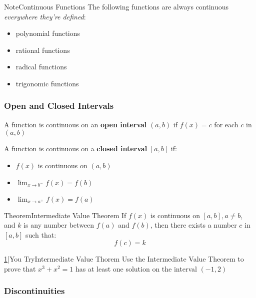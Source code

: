 \documentclass{MathNotes}
\newenvironment{note}[1]
{\begin{YellowBox}{Note}{#1}}{\end{YellowBox}}
\newenvironment{theorem}[1]
{\begin{GrayBox}{Theorem}{#1}}{\end{GrayBox}}
\newenvironment{practice}[2]
{\begin{PurpleBox}{\texorpdfstring{#1}\Big|You Try}{#2}}{\end{PurpleBox}}
\begin{document}
\begin{note}{Continuous Functions}
    The following functions are always continuous \textit{everywhere
    they're defined}:
    \begin{itemize}
        \item polynomial functions
        \item rational functions
        \item radical functions
        \item trigonomic functions
    \end{itemize}
\end{note}

\subsubsection{Open and Closed Intervals}\label{sec:1.3.1}
A function is continuous on an \textbf{open interval} $(a, b)$ if
$f(x)=c$ for each $c$ in $(a, b)$

A function is continuous on a \textbf{closed interval} $[a, b]$ if:
\begin{itemize}
    \item $f(x)$ is continuous on $(a, b)$
    \item $\lim_{x\to b^-}f(x)=f(b)$
    \item $\lim_{x\to a^+}f(x)=f(a)$
\end{itemize}

\begin{theorem}{Intermediate Value Theorem}
    If $f(x)$ is continuous on $[a, b], a\neq b$, and $k$ is any number
    between $f(a)$ and $f(b)$, then there exists a number $c$ in
    $[a, b]$ such that: $$f(c)=k$$
\end{theorem}

\begin{practice}{\hyperref[ans:1.3.1-1]{1}}{Intermediate Value Thorem}
    \label{prac:1.3.1-1}
    Use the Intermediate Value Theorem to prove that $x^3+x^2=1$ has at least
    one solution on the interval $(-1, 2)$
\end{practice}

\subsubsection{Discontinuities}
\end{document}
